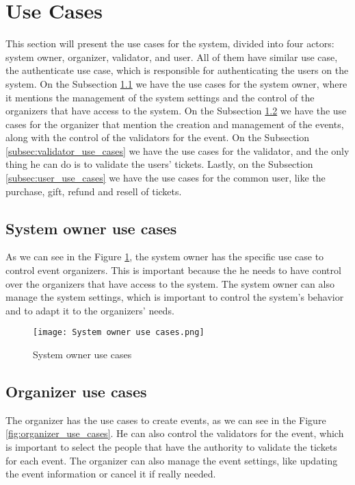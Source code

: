 \section{Use Cases}
\label{sec:use_cases}

This section will present the use cases for the system, divided into four actors: system owner, organizer, validator, and user. All of them have similar use case, the authenticate use case, which is responsible for authenticating the users on the system.
On the Subsection \ref{subsec:system_owner_use_cases} we have the use cases for the system owner, where it mentions the management of the system settings and the control of the organizers that have access to the system.
On the Subsection \ref{subsec:organizer_use_cases} we have the use cases for the organizer that mention the creation and management of the events, along with the control of the validators for the event.
On the Subsection \ref{subsec:validator_use_cases} we have the use cases for the validator, and the only thing he can do is to validate the users' tickets.
Lastly, on the Subsection \ref{subsec:user_use_cases} we have the use cases for the common user, like the purchase, gift, refund and resell of tickets.

\subsection{System owner use cases}
\label{subsec:system_owner_use_cases}

As we can see in the Figure \ref{fig:system_owner_use_cases}, the system owner has the specific use case to control event organizers. This is important because the he needs to have control over the organizers that have access to the system. The system owner can also manage the system settings, which is important to control the system's behavior and to adapt it to the organizers' needs.

\begin{figure}[H]
    \texttt{[image: System owner use cases.png]}
    \centering
    \caption{System owner use cases}
    \label{fig:system_owner_use_cases}
\end{figure}

\subsection{Organizer use cases}
\label{subsec:organizer_use_cases}

The organizer has the use cases to create events, as we can see in the Figure \ref{fig:organizer_use_cases}. He can also control the validators for the event, which is important to select the people that have the authority to validate the tickets for each event. The organizer can also manage the event settings, like updating the event information or cancel it if really needed.

